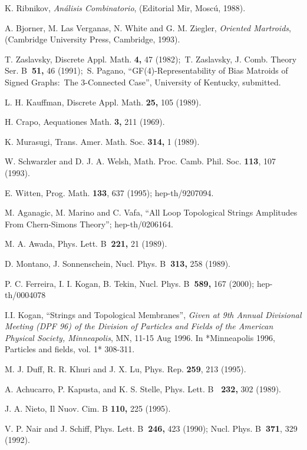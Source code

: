 \documentclass[a4paper,12pt]{article}
\begin{document}
\begin{thebibliography}{99}
  K. Ribnikov, \textit{An\'{a}lisis Combinatorio}, (Editorial
Mir, Mosc\'{u}, 1988).

  A. Bjorner, M. Las Verganas, N. White and G. M. Ziegler, 
\textit{Oriented Martroids}, (Cambridge University Press, Cambridge, 1993).

  T. Zaslavsky, Discrete Appl. Math. \textbf{4,} 47 (1982);\ T.
Zaslavsky, J. Comb. Theory Ser. B\textbf{\ 51,} 46 (1991);\ S. Pagano,
``GF(4)-Representability of Bias Matroids of Signed Graphs:\ The 3-Connected
Case'', University of Kentucky, submitted.

  L. H. Kauffman, Discrete Appl. Math. \textbf{25,} 105 (1989).

  H. Crapo, Aequationes Math. \textbf{3,} 211 (1969).

  K. Murasugi, Trans. Amer. Math. Soc. \textbf{314,} 1 (1989).

  W. Schwarzler and D. J. A. Welsh, Math. Proc. Camb. Phil. Soc. 
\textbf{113}, 107 (1993).

  E. Witten, Prog. Math. \textbf{133}, 637 (1995);
hep-th/9207094.

  M. Aganagic, M. Marino and C. Vafa, ``All Loop Topological
Strings Amplitudes From Chern-Simons Theory''; hep-th/0206164.

  M. A. Awada, Phys. Lett. B\textbf{\ 221,} 21 (1989).

  D. Montano, J. Sonnenschein, Nucl. Phys. B\textbf{\ 313,} 258
(1989).

  P. C. Ferreira, I. I. Kogan, B. Tekin, Nucl. Phys. B\textbf{\
589,} 167 (2000); hep-th/0004078

  I.I. Kogan, ``Strings and Topological Membranes'', \textit{%
Given at 9th Annual Divisional Meeting (DPF 96) of the Division of Particles
and Fields of the American Physical Society, Minneapolis}, MN, 11-15 Aug
1996. In *Minneapolis 1996, Particles and fields, vol. 1* 308-311.

  M. J. Duff, R. R. Khuri and J. X. Lu, Phys. Rep. \textbf{259},
213 (1995).

  A. Achucarro, P. Kapusta, and K. S. Stelle, Phys. Lett. B%
\textbf{\ 232,} 302 (1989).

  J. A. Nieto, Il Nuov. Cim. B \textbf{110, }225 (1995).

  V. P. Nair and J. Schiff, Phys. Lett. B\textbf{\ 246,} 423
(1990); Nucl. Phys. B\textbf{\ 371}, 329 (1992).


\end{thebibliography}
\end{document}
